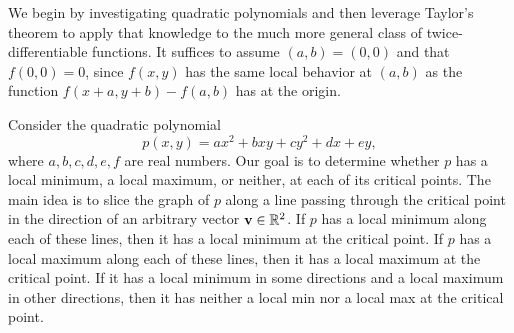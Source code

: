\documentclass{watsonbook}
\begin{document}
  \begin{pf}
    We begin by investigating quadratic polynomials and then leverage
    Taylor's theorem to apply that knowledge to the much more general
    class of twice-differentiable functions. It suffices to assume
    $(a,b) = (0,0)$ and that $f(0,0) = 0$, since $f(x,y)$ has the same
    local behavior at $(a,b)$ as the function $f(x+a, y+b)-f(a,b)$ has
    at the origin.
    
    Consider the quadratic polynomial 
    \[
      p(x,y) = ax^2  + b xy + cy^2 + dx + ey, 
    \]
    where $a,b,c,d,e,f$ are real numbers.  Our goal is to determine
    whether $p$ has a local minimum, a local maximum, or neither, at
    each of its critical points. The main idea is to slice the graph
    of $p$ along a line passing through the critical point in the
    direction of an arbitrary vector $\mathbf{v} \in \mathbb{R}^2$. If $p$ has
    a local minimum along each of these lines, then it has a local
    minimum at the critical point.  If $p$ has a local maximum along
    each of these lines, then it has a local maximum at the critical
    point. If it has a local minimum in some directions and a local
    maximum in other directions, then it has neither a local min nor a
    local max at the critical point.
    

\end{pf}
\end{document}
